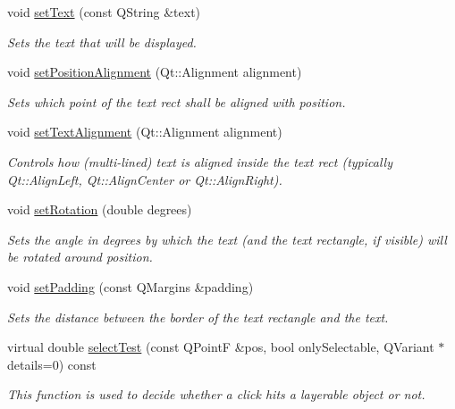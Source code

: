 \begin{DoxyCompactItemize}
void \hyperlink{classQCPItemText_a3dacdda0ac88f99a05b333b977c48747}{set\+Text} (const Q\+String \&text)
\begin{DoxyCompactList}\small\item\em Sets the text that will be displayed. \end{DoxyCompactList}\item 
void \hyperlink{classQCPItemText_a781cdf8c640fc6a055dcff1e675c8c7a}{set\+Position\+Alignment} (Qt\+::\+Alignment alignment)
\begin{DoxyCompactList}\small\item\em Sets which point of the text rect shall be aligned with {\itshape position}. \end{DoxyCompactList}\item 
\hypertarget{classQCPItemText_ab5bc0684c4d1bed81949a11b34dba478}{}void \hyperlink{classQCPItemText_ab5bc0684c4d1bed81949a11b34dba478}{set\+Text\+Alignment} (Qt\+::\+Alignment alignment)\label{classQCPItemText_ab5bc0684c4d1bed81949a11b34dba478}

\begin{DoxyCompactList}\small\item\em Controls how (multi-\/lined) text is aligned inside the text rect (typically Qt\+::\+Align\+Left, Qt\+::\+Align\+Center or Qt\+::\+Align\+Right). \end{DoxyCompactList}\item 
\hypertarget{classQCPItemText_a4bcc10cd97952c3f749d75824b5077f0}{}void \hyperlink{classQCPItemText_a4bcc10cd97952c3f749d75824b5077f0}{set\+Rotation} (double degrees)\label{classQCPItemText_a4bcc10cd97952c3f749d75824b5077f0}

\begin{DoxyCompactList}\small\item\em Sets the angle in degrees by which the text (and the text rectangle, if visible) will be rotated around {\itshape position}. \end{DoxyCompactList}\item 
void \hyperlink{classQCPItemText_aeea8a3e01f135f9dd0bb08f51db66310}{set\+Padding} (const Q\+Margins \&padding)
\begin{DoxyCompactList}\small\item\em Sets the distance between the border of the text rectangle and the text. \end{DoxyCompactList}\item 
virtual double \hyperlink{classQCPItemText_a285b95bb6634c2e4f7768abb7a8bc69c}{select\+Test} (const Q\+Point\+F \&pos, bool only\+Selectable, Q\+Variant $\ast$details=0) const 
\begin{DoxyCompactList}\small\item\em This function is used to decide whether a click hits a layerable object or not. \end{DoxyCompactList}\end{DoxyCompactItemize}
